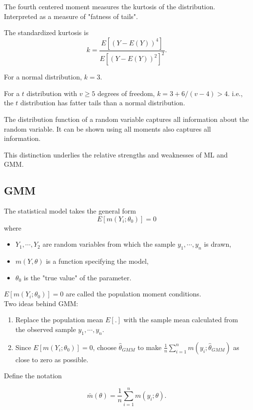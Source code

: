 The fourth centered moment measures the kurtosis of the
distribution.  Interpreted as a measure of "fatness of tails".

The standardized kurtosis is
\[k=\frac{E[(Y-E(Y))^4]}{E[(Y-E(Y))^2]^2}.\]

For a normal distribution, $k=3.$

For a $t$ distribution with $v \geq 5$ degrees of freedom,
$k=3+6/(v-4) > 4.$  i.e., the $t$ distribution has fatter tails
than a normal distribution.

The distribution function of a random variable captures all
information about the random variable.  It can be shown using all
moments also captures all information.

This distinction underlies the relative strengths and weaknesses
of ML and GMM.

\subsection{GMM}

The statistical model takes the general form
\begin{equation}
E[m(Y_i; \theta_0)]=0
\end{equation}
where
\begin{itemize}
\item $Y_1, \cdots, Y_2$ are random variables from which the
sample $y_1, \cdots, y_n$ is drawn, \item $m(Y, \theta)$ is a
function specifying the model, \item $\theta_0$ is the "true
value" of the parameter.
\end{itemize}

$E[m(Y_i; \theta_0)]=0$ are called the population moment
conditions.\\

Two ideas behind GMM:
\begin{enumerate}
\item Replace the population mean $E[.]$ with the sample mean
  calculated from the observed sample $y_1, \cdots, y_n$. \item Since
  $E[m(Y_i; \theta_0)]=0$, choose $\hat \theta_{GMM}$ to make
  $\frac{1}{n}\sum_{i=1}^{n}m(y_i; \hat \theta_{GMM})$ as close to
  zero as possible.
\end{enumerate}

Define the notation

\begin{equation}
\bar m(\theta)=\frac{1}{n} \sum_{i=1}^n m(y_i; \theta).
\end{equation}

